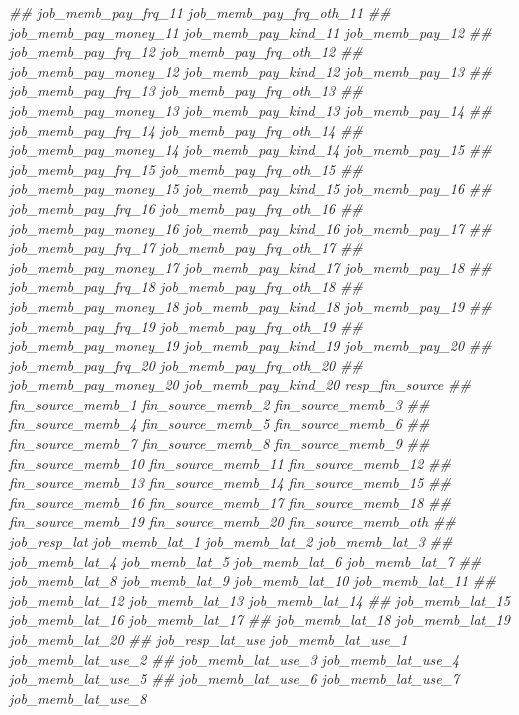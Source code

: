 \documentclass[
]{article}
\newenvironment{Shaded}{\begin{snugshade}}{\end{snugshade}}
\newcommand{\CommentTok}[1]{\textcolor[rgb]{0.56,0.35,0.01}{\textit{#1}}}
\begin{document}
\begin{Shaded}
\begin{Highlighting}[]
\CommentTok{##      job_memb_pay_frq_11 job_memb_pay_frq_oth_11}
\CommentTok{##      job_memb_pay_money_11 job_memb_pay_kind_11 job_memb_pay_12}
\CommentTok{##      job_memb_pay_frq_12 job_memb_pay_frq_oth_12}
\CommentTok{##      job_memb_pay_money_12 job_memb_pay_kind_12 job_memb_pay_13}
\CommentTok{##      job_memb_pay_frq_13 job_memb_pay_frq_oth_13}
\CommentTok{##      job_memb_pay_money_13 job_memb_pay_kind_13 job_memb_pay_14}
\CommentTok{##      job_memb_pay_frq_14 job_memb_pay_frq_oth_14}
\CommentTok{##      job_memb_pay_money_14 job_memb_pay_kind_14 job_memb_pay_15}
\CommentTok{##      job_memb_pay_frq_15 job_memb_pay_frq_oth_15}
\CommentTok{##      job_memb_pay_money_15 job_memb_pay_kind_15 job_memb_pay_16}
\CommentTok{##      job_memb_pay_frq_16 job_memb_pay_frq_oth_16}
\CommentTok{##      job_memb_pay_money_16 job_memb_pay_kind_16 job_memb_pay_17}
\CommentTok{##      job_memb_pay_frq_17 job_memb_pay_frq_oth_17}
\CommentTok{##      job_memb_pay_money_17 job_memb_pay_kind_17 job_memb_pay_18}
\CommentTok{##      job_memb_pay_frq_18 job_memb_pay_frq_oth_18}
\CommentTok{##      job_memb_pay_money_18 job_memb_pay_kind_18 job_memb_pay_19}
\CommentTok{##      job_memb_pay_frq_19 job_memb_pay_frq_oth_19}
\CommentTok{##      job_memb_pay_money_19 job_memb_pay_kind_19 job_memb_pay_20}
\CommentTok{##      job_memb_pay_frq_20 job_memb_pay_frq_oth_20}
\CommentTok{##      job_memb_pay_money_20 job_memb_pay_kind_20 resp_fin_source}
\CommentTok{##      fin_source_memb_1 fin_source_memb_2 fin_source_memb_3}
\CommentTok{##      fin_source_memb_4 fin_source_memb_5 fin_source_memb_6}
\CommentTok{##      fin_source_memb_7 fin_source_memb_8 fin_source_memb_9}
\CommentTok{##      fin_source_memb_10 fin_source_memb_11 fin_source_memb_12}
\CommentTok{##      fin_source_memb_13 fin_source_memb_14 fin_source_memb_15}
\CommentTok{##      fin_source_memb_16 fin_source_memb_17 fin_source_memb_18}
\CommentTok{##      fin_source_memb_19 fin_source_memb_20 fin_source_memb_oth}
\CommentTok{##      job_resp_lat job_memb_lat_1 job_memb_lat_2 job_memb_lat_3}
\CommentTok{##      job_memb_lat_4 job_memb_lat_5 job_memb_lat_6 job_memb_lat_7}
\CommentTok{##      job_memb_lat_8 job_memb_lat_9 job_memb_lat_10 job_memb_lat_11}
\CommentTok{##      job_memb_lat_12 job_memb_lat_13 job_memb_lat_14}
\CommentTok{##      job_memb_lat_15 job_memb_lat_16 job_memb_lat_17}
\CommentTok{##      job_memb_lat_18 job_memb_lat_19 job_memb_lat_20}
\CommentTok{##      job_resp_lat_use job_memb_lat_use_1 job_memb_lat_use_2}
\CommentTok{##      job_memb_lat_use_3 job_memb_lat_use_4 job_memb_lat_use_5}
\CommentTok{##      job_memb_lat_use_6 job_memb_lat_use_7 job_memb_lat_use_8}

\end{Highlighting}
\end{Shaded}
\end{document}
